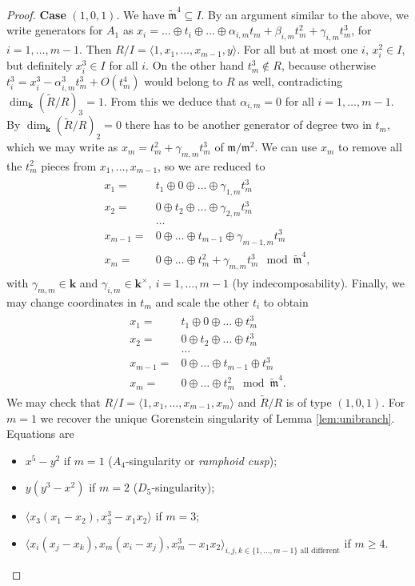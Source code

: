 \documentclass[11pt]{amsart}
\renewcommand{\k}{\mathbf k}
\newcommand{\m}{\mathfrak m}
\newcommand{\tR}{\widetilde{R}}
\newcommand{\tm}{\widetilde{\mathfrak m}}
\theoremstyle{plain}
\theoremstyle{definition}
\begin{document}
\begin{proof}
 
 \textbf{Case} $(1,0,1)$. We have $\tm^4\subseteq I$. By an argument similar to the above, we write generators for $A_1$ as $x_i=\ldots\oplus t_i\oplus\ldots \oplus\alpha_{i,m}t_m+\beta_{i,m}t_m^2+\gamma_{i,m}t_m^3$, for $i=1,\ldots,m-1$.
 Then $R/I=\langle 1,x_1,\ldots,x_{m-1},y\rangle$. For all but at most one $i$, $x_i^2\in I$, but definitely $x_i^3\in I$ for all $i$. On the other hand $t_m^3\notin R$, because otherwise $t_i^3=x_i^3-\alpha_{i,m}^3t_m^3+O(t_m^4)$ would belong to $R$ as well, contradicting $\dim_\k(\tR/R)_3=1$. From this we deduce that $\alpha_{i,m}=0$ for all $i=1,\ldots,m-1$. By $\dim_\k(\tR/R)_2=0$ there has to be another generator of degree two in $t_m$, which we may write as $x_m=t_m^2+\gamma_{m,m}t_m^3$ of $\m/\m^2$. We can use $x_m$ to remove all the $t_m^2$ pieces from $x_1,\ldots,x_{m-1}$, so we are reduced to
  \begin{align}\label{coordIII-cs}
 \begin{split}
  x_1= & t_1\oplus0\oplus\ldots\oplus \gamma_{1,m}t_m^3\\
  x_2= & 0\oplus t_2\oplus\ldots\oplus \gamma_{2,m}t_m^3\\
  &\ldots\\
  x_{m-1}= & 0\oplus\ldots\oplus t_{m-1}\oplus \gamma_{m-1,m}t_m^3\\
  x_m= & 0\oplus\ldots\oplus t_m^2+\gamma_{m,m}t_m^3 \mod\tm^4,
  \end{split}
 \end{align}
 with $\gamma_{m,m}\in\k$ and $\gamma_{i,m}\in\k^\times,\ i=1,\ldots,m-1$ (by indecomposability). Finally, we may change coordinates in $t_m$ and scale the other $t_i$ to obtain
 \begin{align}\label{coordIII}
 \begin{split}
  x_1= & t_1\oplus0\oplus\ldots\oplus t_m^3\\
  x_2= & 0\oplus t_2\oplus\ldots\oplus t_m^3\\
  &\ldots\\
  x_{m-1}= & 0\oplus\ldots\oplus t_{m-1}\oplus t_m^3\\
  x_m= & 0\oplus\ldots\oplus t_m^2 \mod\tm^4.
  \end{split}
 \end{align}
 We may check that $R/I=\langle 1,x_1,\ldots,x_{m-1},x_m\rangle$ and $\tR/R$ is of type $(1,0,1)$. For $m=1$ we recover the unique Gorenstein singularity of Lemma \ref{lem:unibranch}. Equations are
 \begin{itemize}
  \item $x^5-y^2$ if $m=1$ ($A_4$-singularity or \emph{ramphoid cusp});
  \item $y(y^3-x^2)$ if $m=2$ ($D_5$-singularity);
  \item $\langle x_3(x_1-x_2),x_3^3-x_1x_2\rangle$ if $m=3$;
  \item $\langle x_i(x_j-x_k), x_m(x_i-x_j),x_m^3-x_1x_2\rangle_{i,j,k\in\{1,\ldots,m-1\}\text{ all different}}$ if $m\geq 4$.
 \end{itemize}
\end{proof}
\end{document}
